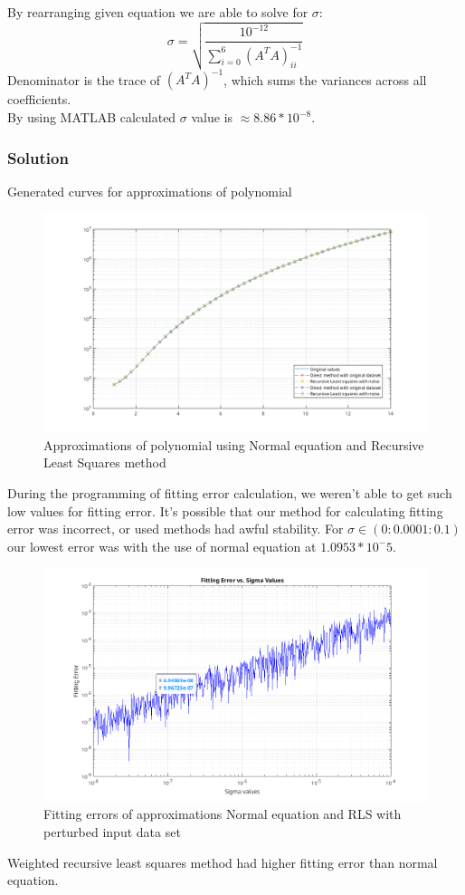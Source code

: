 By rearranging given equation we are able to solve for \(\sigma\):
\[
    \sigma = \sqrt{\frac{10^{-12}}{\sum_{i=0}^6 (A^T A)^{-1}_{ii}}}
\]
Denominator is the trace of \((A^T A)^{-1}\), which sums the variances across all coefficients.\\
By using MATLAB calculated $\sigma$ value is $\approx 8.86*10^{-8}$.

\subsubsection*{Solution}
Generated curves for approximations of polynomial 
\begin{figure}[H]
    \centering
    \includegraphics[width=1\textwidth]{images/Problem_11/ApproxCurves.png}
    \caption{Approximations of polynomial using Normal equation and Recursive Least Squares method}
\end{figure}
During the programming of fitting error calculation, we weren't able to get such low values for fitting error. 
It's possible that our method for calculating fitting error was incorrect, or used methods had awful stability.
For $\sigma \in (0:0.0001:0.1)$ our lowest error was with the use of normal equation at $1.0953*10^-5$.
\begin{figure}[H]
    \centering
    \includegraphics[width=1\textwidth]{images/Problem_11/fittingErrors.png}
    \caption{Fitting errors of approximations Normal equation and RLS with perturbed input data set}
\end{figure}
Weighted recursive least squares method had higher fitting error than normal equation.
